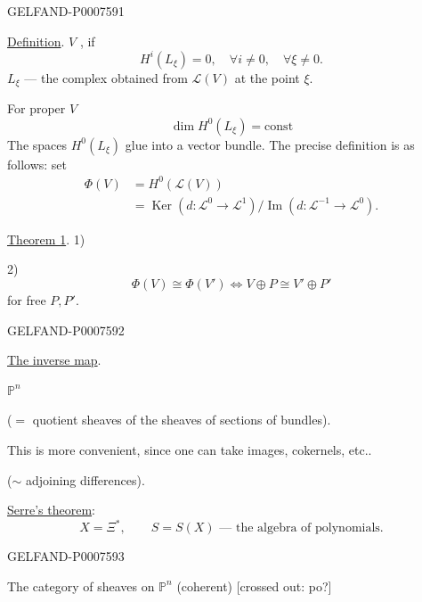 \begin{GelfandAdjacentEvidence}{GELFAND-P000759}{1}

\underline{Definition}. \(V\) , if
\[
H^i(L_\xi)=0,\quad\forall i\ne0,\quad\forall\xi\ne0.
\]
\(L_\xi\) --- the complex obtained from \(\mathcal L(V)\) at the point \(\xi\).

For proper \(V\)
\[
\dim H^0(L_\xi)=\mathrm{const}
\]
The spaces \(H^0(L_\xi)\) glue into a vector bundle.
The precise definition is as follows: set
\[
\begin{aligned}
\Phi(V)&=H^0(\mathcal L(V))\\
&=\operatorname{Ker}(d:\mathcal L^0\to\mathcal L^1)
\big/\operatorname{Im}(d:\mathcal L^{-1}\to\mathcal L^0).
\end{aligned}
\]

\underline{Theorem 1}.
1) 

2)
\[
\Phi(V)\cong\Phi(V')\Longleftrightarrow
V\oplus P\cong V'\oplus P'
\]
for free \(P,P'\).
\end{GelfandAdjacentEvidence}
\begin{GelfandAdjacentEvidence}{GELFAND-P000759}{2}


\underline{The inverse map}.

 \(\mathbb P^n\)

(\(=\) quotient sheaves of the sheaves of sections of bundles).

This is more convenient, since one can take images, cokernels, etc..

(\(\sim\) adjoining differences).

\underline{Serre's theorem}:
\[
X=\Xi^*,\qquad S=S(X)\text{ --- the algebra of polynomials.}
\]
\end{GelfandAdjacentEvidence}
\begin{GelfandAdjacentEvidence}{GELFAND-P000759}{3}


The category of sheaves on \(\mathbb P^n\) (coherent)
[crossed out: po?]
\end{GelfandAdjacentEvidence}
